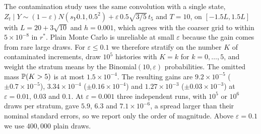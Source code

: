 The contamination study uses the same convolution with a single state, $Z_t\mid Y\sim(1-\varepsilon)N(s_Y0.1,0.5^2)+\varepsilon\,0.5\sqrt{3/5}\,t_5$ and $T=10$, on $[-1.5L,1.5L]$ with $L=20+3\sqrt{10}$ and $h=0.001$, which agrees with the coarser grid to within $5\times10^{-8}$ in $r^*$. Plain Monte Carlo is unreliable at small $\varepsilon$ because the gain comes from rare large draws. For $\varepsilon\le0.1$ we therefore stratify on the number $K$ of contaminated increments, draw $10^5$ histories with $K=k$ for $k=0,\ldots,5$, and weight the stratum means by the Binomial$(10,\varepsilon)$ probabilities. The omitted mass $\mathbb P(K>5)$ is at most $1.5\times10^{-4}$. The resulting gains are $9.2\times10^{-5}$ ($\pm0.7\times10^{-5}$), $3.34\times10^{-4}$ ($\pm0.16\times10^{-4}$) and $1.27\times10^{-3}$ ($\pm0.03\times10^{-3}$) at $\varepsilon=0.01$, $0.03$ and $0.1$. At $\varepsilon=0.001$ three independent runs, with $10^5$ or $10^6$ draws per stratum, gave $5.9$, $6.3$ and $7.1\times10^{-6}$, a spread larger than their nominal standard errors, so we report only the order of magnitude. Above $\varepsilon=0.1$ we use $400{,}000$ plain draws.

